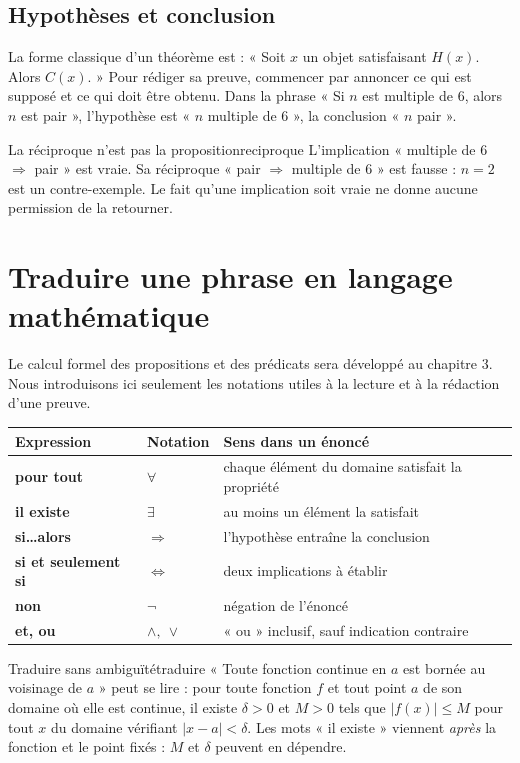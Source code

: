 \subsection{Hypothèses et conclusion}
La forme classique d'un théorème est : « Soit $x$ un objet satisfaisant $H(x)$. Alors $C(x)$. » Pour rédiger sa preuve, commencer par annoncer ce qui est supposé et ce qui doit être obtenu. Dans la phrase « Si $n$ est multiple de $6$, alors $n$ est pair », l'hypothèse est « $n$ multiple de $6$ », la conclusion « $n$ pair ».

\begin{exemple}{La réciproque n'est pas la proposition}{reciproque}
L'implication « multiple de $6$ $\Rightarrow$ pair » est vraie. Sa réciproque « pair $\Rightarrow$ multiple de $6$ » est fausse : $n=2$ est un contre-exemple. Le fait qu'une implication soit vraie ne donne aucune permission de la retourner.
\end{exemple}

\section{Traduire une phrase en langage mathématique}
Le calcul formel des propositions et des prédicats sera développé au chapitre 3. Nous introduisons ici seulement les notations utiles à la lecture et à la rédaction d'une preuve.

\begin{center}\renewcommand{\arraystretch}{1.3}
\begin{tabularx}{\textwidth}{>{\bfseries}l l X}\toprule
Expression & Notation & Sens dans un énoncé \\ \midrule
pour tout & $\forall$ & chaque élément du domaine satisfait la propriété \\
il existe & $\exists$ & au moins un élément la satisfait \\
si\ldots alors & $\Rightarrow$ & l'hypothèse entraîne la conclusion \\
si et seulement si & $\Leftrightarrow$ & deux implications à établir \\
non & $\neg$ & négation de l'énoncé \\
et, ou & $\wedge,\ \vee$ & « ou » inclusif, sauf indication contraire \\ \bottomrule
\end{tabularx}\end{center}

\begin{exemple}{Traduire sans ambiguïté}{traduire}
« Toute fonction continue en $a$ est bornée au voisinage de $a$ » peut se lire : pour toute fonction $f$ et tout point $a$ de son domaine où elle est continue, il existe $\delta>0$ et $M>0$ tels que $|f(x)|\le M$ pour tout $x$ du domaine vérifiant $|x-a|<\delta$. Les mots « il existe » viennent \emph{après} la fonction et le point fixés : $M$ et $\delta$ peuvent en dépendre.
\end{exemple}

